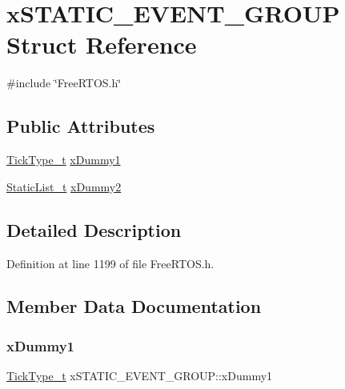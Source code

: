 \hypertarget{structxSTATIC__EVENT__GROUP}{}\section{x\+S\+T\+A\+T\+I\+C\+\_\+\+E\+V\+E\+N\+T\+\_\+\+G\+R\+O\+UP Struct Reference}
\label{structxSTATIC__EVENT__GROUP}


{\ttfamily \#include \char`\"{}Free\+R\+T\+O\+S.\+h\char`\"{}}

\subsection*{Public Attributes}
\begin{DoxyCompactItemize}
\item 
\hyperlink{pic32mx_2portmacro_8h_aa69c48c6e902ce54f70886e6573c92a9}{Tick\+Type\+\_\+t} \hyperlink{structxSTATIC__EVENT__GROUP_a4ed0094f715dd8f79a354f42fd973fc6}{x\+Dummy1}
\item 
\hyperlink{FreeRTOS_8h_a9735ad9101a2bd25f83a62089a4acee6}{Static\+List\+\_\+t} \hyperlink{structxSTATIC__EVENT__GROUP_a17d070c972ecd0151d7505a539653551}{x\+Dummy2}
\end{DoxyCompactItemize}


\subsection{Detailed Description}


Definition at line 1199 of file Free\+R\+T\+O\+S.\+h.



\subsection{Member Data Documentation}
\mbox{\label{structxSTATIC__EVENT__GROUP_a4ed0094f715dd8f79a354f42fd973fc6}} 
\subsubsection{\texorpdfstring{x\+Dummy1}{xDummy1}}
{\footnotesize\ttfamily \hyperlink{pic32mx_2portmacro_8h_aa69c48c6e902ce54f70886e6573c92a9}{Tick\+Type\+\_\+t} x\+S\+T\+A\+T\+I\+C\+\_\+\+E\+V\+E\+N\+T\+\_\+\+G\+R\+O\+U\+P\+::x\+Dummy1}



